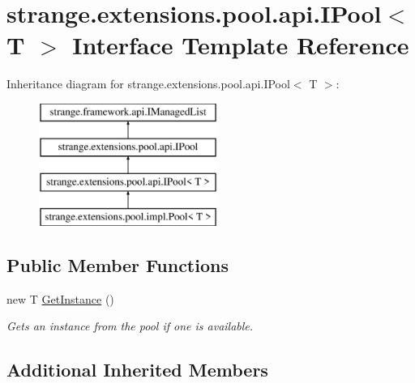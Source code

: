 \hypertarget{interfacestrange_1_1extensions_1_1pool_1_1api_1_1_i_pool_3_01_t_01_4}{\section{strange.\-extensions.\-pool.\-api.\-I\-Pool$<$ T $>$ Interface Template Reference}
\label{interfacestrange_1_1extensions_1_1pool_1_1api_1_1_i_pool_3_01_t_01_4}
}
Inheritance diagram for strange.\-extensions.\-pool.\-api.\-I\-Pool$<$ T $>$\-:\begin{figure}[H]
\begin{center}
\leavevmode
\includegraphics[height=4.000000cm]{interfacestrange_1_1extensions_1_1pool_1_1api_1_1_i_pool_3_01_t_01_4}
\end{center}
\end{figure}
\subsection*{Public Member Functions}
\begin{DoxyCompactItemize}
\item 
new T \hyperlink{interfacestrange_1_1extensions_1_1pool_1_1api_1_1_i_pool_3_01_t_01_4_abcfc75098a95cf8ad7fdca472a0fb623}{Get\-Instance} ()
\begin{DoxyCompactList}\small\item\em Gets an instance from the pool if one is available. \end{DoxyCompactList}\end{DoxyCompactItemize}
\subsection*{Additional Inherited Members}


